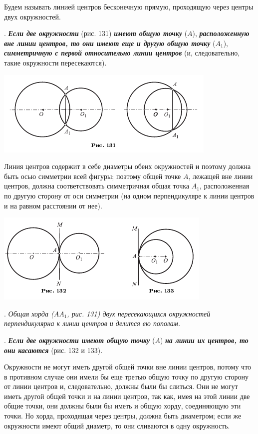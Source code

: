 \documentclass[oneside]{book}
\begin{document}
Будем называть линией центров бесконечную прямую, проходящую через центры двух окружностей.

.
\textbf{\emph{Если две окружности}} (рис. 131) \textbf{\emph{имеют общую точку}} ($A$), \textbf{\emph{расположенную вне линии центров, то они имеют еще и другую общую точку}} ($A_1$), \textbf{\emph{симметричную с первой относительно линии центров}} (и, следовательно, такие окружности пересекаются).

\includegraphics{pics/ris-131}

Линия центров содержит в себе диаметры обеих окружностей и поэтому должна быть осью симметрии всей фигуры;
поэтому общей точке $A$, лежащей вне линии центров, должна соответствовать симметричная общая точка $A_1$, расположенная по другую сторону от оси симметрии (на одном перпендикуляре к линии центров и на равном расстоянии от нее).

\includegraphics{pics/ris-132-133}

.
\emph{Общая хорда \emph{($AA_1$, рис. 131)} двух пересекающихся окружностей перпендикулярна к линии центров и делится ею пополам.}

.
\textbf{\emph{Если две окружности имеют общую точку}} ($A$) \textbf{\emph{на линии их центров, то они касаются}} (рис. 132 и 133).

Окружности не могут иметь другой общей точки вне линии центров, потому что в противном случае они имели бы еще третью общую точку по другую сторону от линии центров и, следовательно, должны были бы слиться.
Они не могут иметь другой общей точки и на линии центров, так как, имея на этой линии две общие точки, они должны были бы иметь и общую хорду, соединяющую эти точки.
Но хорда, проходящая через центры, должна быть диаметром;
если же окружности имеют общий диаметр, то они сливаются в одну окружность.
\end{document}
